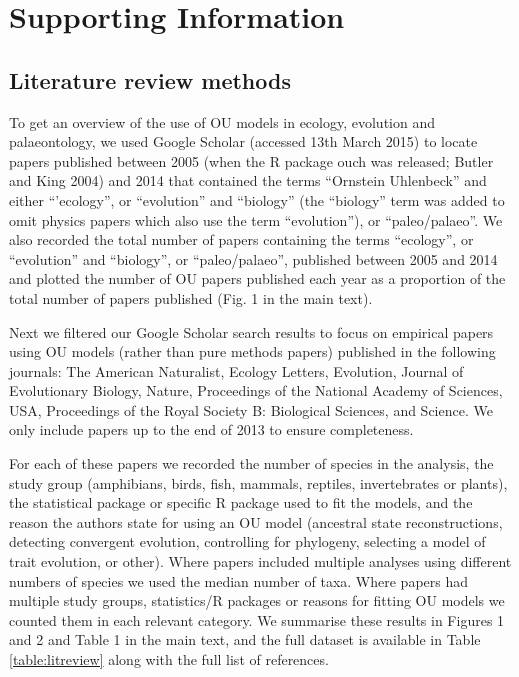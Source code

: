 \documentclass[a4paper,12pt]{article}
\begin{document}
\raggedright
\doublespacing
\setlength{\parindent}{1cm}

\section{Supporting Information}
\setcounter{table}{0} \renewcommand{\thetable}{S\arabic{table}}

  \subsection{Literature review methods}
    To get an overview of the use of OU models in ecology, evolution and palaeontology, we used Google Scholar (accessed 13th March 2015) to locate papers published between 2005 (when the R package ouch was released; Butler and King 2004) and 2014 that contained the terms ``Ornstein Uhlenbeck'' and either ``'ecology'', or ``evolution'' and ``biology'' (the ``biology'' term was added to omit physics papers which also use the term ``evolution''), or ``paleo/palaeo''. 
    We also recorded the total number of papers containing the terms ``ecology'', or ``evolution'' and ``biology'', or ``paleo/palaeo'', published between 2005 and 2014 and plotted the number of OU papers published each year as a proportion of the total number of papers published (Fig. 1 in the main text). 

    Next we filtered our Google Scholar search results to focus on empirical papers using OU models (rather than pure methods papers) published in the following journals: The American Naturalist, Ecology Letters, Evolution, Journal of Evolutionary Biology, Nature, Proceedings of the National Academy of Sciences, USA, Proceedings of the Royal Society B: Biological Sciences, and Science.
    We only include papers up to the end of 2013 to ensure completeness.

    For each of these papers we recorded the number of species in the analysis, the study group (amphibians, birds, fish, mammals, reptiles, invertebrates or plants), the statistical package or specific R package used to fit the models, and the reason the authors state for using an OU model (ancestral state reconstructions, detecting convergent evolution, controlling for phylogeny, selecting a model of trait evolution, or other). 
    Where papers included multiple analyses using different numbers of species we used the median number of taxa. 
    Where papers had multiple study groups, statistics/R packages or reasons for fitting OU models we counted them in each relevant category. 
    We summarise these results in Figures 1 and 2 and Table 1 in the main text, and the full dataset is available in Table \ref{table:litreview} along with the full list of references.
\end{document}

